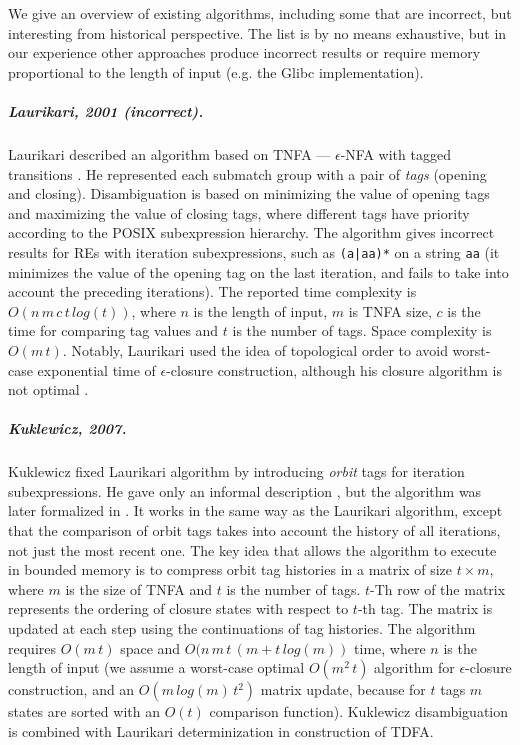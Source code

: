 \documentclass[AMA,STIX1COL]{WileyNJD-v2}
\begin{document}
We give an overview of existing algorithms, including some that are incorrect, but interesting from historical perspective.
The list is by no means exhaustive, but in our experience other approaches
produce incorrect results or require memory proportional to the length of input (e.g. the Glibc implementation\cite{Glibc}).

\subparagraph{Laurikari, 2001 (incorrect).}

Laurikari described an algorithm based on TNFA --- $\epsilon$-NFA with tagged transitions \cite{Lau01}.
He represented each submatch group with a pair of \emph{tags} (opening and closing).
Disambiguation is based on minimizing the value of opening tags and maximizing the value of closing tags, where
different tags have priority according to the POSIX subexpression hierarchy.
The algorithm gives incorrect results for REs with iteration subexpressions, such as \texttt{(a|aa)*} on a string \texttt{aa}
(it minimizes the value of the opening tag on the last iteration,
and fails to take into account the preceding iterations).
The reported time complexity is $O(n \, m \, c \, t \, log(t))$, where
$n$ is the length of input,
$m$ is TNFA size,
$c$ is the time for comparing tag values
and $t$ is the number of tags.
Space complexity is $O(m \, t)$.
Notably, Laurikari used the idea of topological order to avoid worst-case exponential time of $\epsilon$-closure construction,
although his closure algorithm is not optimal \cite{Tro17}.

\subparagraph{Kuklewicz, 2007.}

Kuklewicz fixed Laurikari algorithm by introducing \emph{orbit} tags for iteration subexpressions.
He gave only an informal description \cite{Kuk07}, but the algorithm was later formalized in \cite{Tro17}.
It works in the same way as the Laurikari algorithm,
except that the comparison of orbit tags takes into account the history of all iterations, not just the most recent one.
The key idea that allows the algorithm to execute in bounded memory
is to compress orbit tag histories in a matrix of size $t \times m$, where $m$ is the size of TNFA and $t$ is the number of tags.
$t$-Th row of the matrix represents the ordering of closure states with respect to $t$-th tag.
The matrix is updated at each step using the continuations of tag histories.
The algorithm requires $O(m \, t)$ space and $O(n \, m \, t \, (m + t \, log(m))$ time, where $n$ is the length of input
(we assume a worst-case optimal $O(m^2 \, t)$ algorithm for $\epsilon$-closure construction,
and an $O(m \, log(m) \, t^2)$ matrix update, because for $t$ tags $m$ states are sorted with an $O(t)$ comparison function).
Kuklewicz disambiguation is combined with Laurikari determinization in construction of TDFA\cite{Tro17}.
\end{document}
